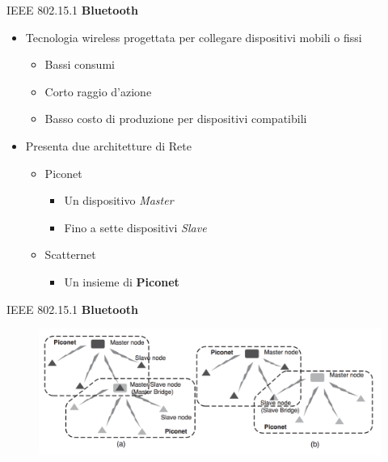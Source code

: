 \begin{frame}{IEEE 802.15.1}
	\textbf{Bluetooth}
	\begin{itemize}[<+- | alert@+>]
		\item Tecnologia wireless progettata per collegare dispositivi mobili o fissi
			\begin{itemize}[<+- | alert@+>]
				\item Bassi consumi
				\item Corto raggio d'azione
				\item Basso costo di produzione per dispositivi compatibili
			\end{itemize}
			\item Presenta due architetture di Rete
			\begin{itemize}[<+- | alert@+>]
				\item Piconet
				\begin{itemize}
					\item Un dispositivo \textit{Master}
					\item Fino a sette dispositivi \textit{Slave}
				\end{itemize}
				\item Scatternet
				\begin{itemize}[<+- | alert@+>]
					\item Un insieme di \textbf{Piconet}
				\end{itemize}
			\end{itemize}
	\end{itemize}		
\end{frame}

\begin{frame}{IEEE 802.15.1}
\textbf{Bluetooth}
	\begin{figure}[h] 
		\includegraphics[scale=0.3,cfbox=blue_slides 1pt 0pt]{imgs/bt.png}
	\end{figure}
\end{frame}

